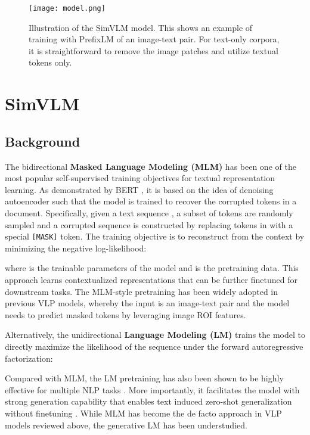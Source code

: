 \documentclass{article} \usepackage{iclr2022_conference,times}
\newcommand{\ours}{SimVLM}
\begin{document}
\begin{figure}[t!]
\begin{center}
\texttt{[image: model.png]}
\end{center}
\caption{Illustration of the SimVLM model. This shows an example of training with PrefixLM of an image-text pair. For text-only corpora, it is straightforward to remove the image patches and utilize textual tokens only.}
\label{fig:model}
\end{figure}

\section{{\ours}} 
\label{sec:approach}

\subsection{Background}

The bidirectional \textbf{Masked Language Modeling (MLM)} has been one of the most popular self-supervised training objectives for textual representation learning.
As demonstrated by BERT \citep{devlin2018bert}, it is based on the idea of denoising autoencoder such that the model is trained to recover the corrupted tokens in a document.
Specifically, given a text sequence , a subset of tokens  are randomly sampled and a corrupted sequence  is constructed by replacing tokens in  with a special \verb+[MASK]+ token.
The training objective is to reconstruct  from the context  by minimizing the negative log-likelihood:

where  is the trainable parameters of the model and  is the pretraining data.
This approach learns contextualized representations that can be further finetuned for downstream tasks.
The MLM-style pretraining has been widely adopted in previous VLP models, 
whereby the input is an image-text pair and the model needs to predict masked tokens by leveraging image ROI features.

Alternatively,
the unidirectional \textbf{Language Modeling (LM)} trains the model to directly maximize the likelihood of the sequence  under the forward autoregressive factorization:

Compared with MLM,
the LM pretraining has also been shown to be highly effective for multiple NLP tasks \citep{radford2018improving}.
More importantly, it facilitates the model with strong generation capability that enables text induced zero-shot generalization without finetuning \citep{brown2020language}.
While MLM has become the de facto approach in VLP models reviewed above, the generative LM has been understudied.
\end{document}
